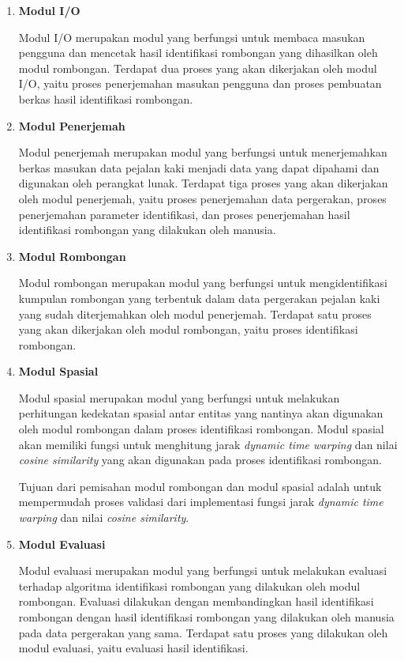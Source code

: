 \begin{enumerate}
    \item \textbf{Modul I/O}
    
    Modul I/O merupakan modul yang berfungsi untuk membaca masukan pengguna dan mencetak hasil identifikasi rombongan yang dihasilkan oleh modul rombongan. Terdapat dua proses yang akan dikerjakan oleh modul I/O, yaitu proses penerjemahan masukan pengguna dan proses pembuatan berkas hasil identifikasi rombongan.
    
    \item \textbf{Modul Penerjemah}
    
    Modul penerjemah merupakan modul yang berfungsi untuk menerjemahkan berkas masukan data pejalan kaki menjadi data yang dapat dipahami dan digunakan oleh perangkat lunak. Terdapat tiga proses yang akan dikerjakan oleh modul penerjemah, yaitu proses penerjemahan data pergerakan, proses penerjemahan parameter identifikasi, dan proses penerjemahan hasil identifikasi rombongan yang dilakukan oleh manusia.
    
    \item \textbf{Modul Rombongan}
    
    Modul rombongan merupakan modul yang berfungsi untuk mengidentifikasi kumpulan rombongan yang terbentuk dalam data pergerakan pejalan kaki yang sudah diterjemahkan oleh modul penerjemah. Terdapat satu proses yang akan dikerjakan oleh modul rombongan, yaitu proses identifikasi rombongan.
    
    \clearpage

    \item \textbf{Modul Spasial}
    
    Modul spasial merupakan modul yang berfungsi untuk melakukan perhitungan kedekatan spasial antar entitas yang nantinya akan digunakan oleh modul rombongan dalam proses identifikasi rombongan. Modul spasial akan memiliki fungsi untuk menghitung jarak \textit{dynamic time warping} dan nilai \textit{cosine similarity} yang akan digunakan pada proses identifikasi rombongan.
    
    Tujuan dari pemisahan modul rombongan dan modul spasial adalah untuk mempermudah proses validasi dari implementasi fungsi jarak \textit{dynamic time warping} dan nilai \textit{cosine similarity}.
    
    \item \textbf{Modul Evaluasi}
    
    Modul evaluasi merupakan modul yang berfungsi untuk melakukan evaluasi terhadap algoritma identifikasi rombongan yang dilakukan oleh modul rombongan. Evaluasi dilakukan dengan membandingkan hasil identifikasi rombongan dengan hasil identifikasi rombongan yang dilakukan oleh manusia pada data pergerakan yang sama. Terdapat satu proses yang dilakukan oleh modul evaluasi, yaitu evaluasi hasil identifikasi.
\end{enumerate}

